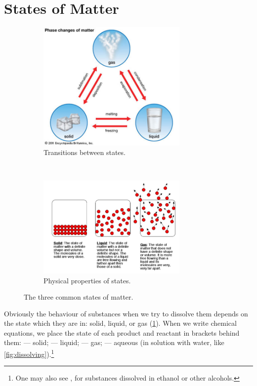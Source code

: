 \documentclass[a4paper]{memoir}
\begin{document}
\section{States of Matter}
\begin{figure}
  \centering
  \begin{subfigure}[t]{\textwidth}
    \centering
    \includegraphics[width=0.8\textwidth]{states1}
    \caption{Transitions between states.}
  \end{subfigure}\\
  \begin{subfigure}[t]{\textwidth}
    \centering
    \includegraphics[width=0.8\textwidth]{states2}
    \caption{Physical properties of states.}
  \end{subfigure}
  \caption{The three common states of matter. \label{fig:states}}
\end{figure}
Obviously the behaviour of substances when we try to dissolve them depends on the state which they are in: solid, liquid, or gas (\cref{fig:states}). When
we write chemical equations, we place the state of each product and reactant in brackets behind them:  --- solid; \ce{(\ell)} --- liquid;
 --- gas;   --- aqueous (in solution with water, like \cref{fig:dissolving}).\footnote{One may also see , for substances dissolved
in ethanol or other alcohols.}
\end{document}
